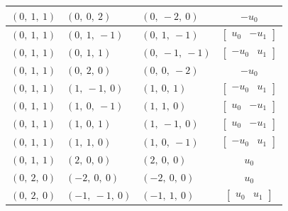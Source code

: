 \documentclass[11pt]{article}
\theoremstyle{definition}
\begin{document}
\begin{longtable}{|l|l|l|c|}
    \hline
    $\left( 0, \  1, \  1\right)$ & $\left( 0, \  0, \  2\right)$ & $\left( 0, \  -2, \  0\right)$ & $- u_{0}$ \\
    \hline
    $\left( 0, \  1, \  1\right)$ & $\left( 0, \  1, \  -1\right)$ & $\left( 0, \  1, \  -1\right)$ & $\left[\begin{matrix}u_{0} & - u_{1}\end{matrix}\right]$ \\
    \hline
    $\left( 0, \  1, \  1\right)$ & $\left( 0, \  1, \  1\right)$ & $\left( 0, \  -1, \  -1\right)$ & $\left[\begin{matrix}- u_{0} & u_{1}\end{matrix}\right]$ \\
    \hline
    $\left( 0, \  1, \  1\right)$ & $\left( 0, \  2, \  0\right)$ & $\left( 0, \  0, \  -2\right)$ & $- u_{0}$ \\
    \hline
    $\left( 0, \  1, \  1\right)$ & $\left( 1, \  -1, \  0\right)$ & $\left( 1, \  0, \  1\right)$ & $\left[\begin{matrix}- u_{0} & u_{1}\end{matrix}\right]$ \\
    \hline
    $\left( 0, \  1, \  1\right)$ & $\left( 1, \  0, \  -1\right)$ & $\left( 1, \  1, \  0\right)$ & $\left[\begin{matrix}u_{0} & - u_{1}\end{matrix}\right]$ \\
    \hline
    $\left( 0, \  1, \  1\right)$ & $\left( 1, \  0, \  1\right)$ & $\left( 1, \  -1, \  0\right)$ & $\left[\begin{matrix}u_{0} & - u_{1}\end{matrix}\right]$ \\
    \hline
    $\left( 0, \  1, \  1\right)$ & $\left( 1, \  1, \  0\right)$ & $\left( 1, \  0, \  -1\right)$ & $\left[\begin{matrix}- u_{0} & u_{1}\end{matrix}\right]$ \\
    \hline
    $\left( 0, \  1, \  1\right)$ & $\left( 2, \  0, \  0\right)$ & $\left( 2, \  0, \  0\right)$ & $u_{0}$ \\
    \hline
    $\left( 0, \  2, \  0\right)$ & $\left( -2, \  0, \  0\right)$ & $\left( -2, \  0, \  0\right)$ & $u_{0}$ \\
    \hline
    $\left( 0, \  2, \  0\right)$ & $\left( -1, \  -1, \  0\right)$ & $\left( -1, \  1, \  0\right)$ & $\left[\begin{matrix}u_{0} & u_{1}\end{matrix}\right]$ \\

\end{longtable}
\end{document}

